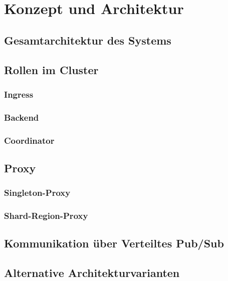 \chapter{Konzept und Architektur}

\section{Gesamtarchitektur des Systems}

\section{Rollen im Cluster}
\subsection{Ingress}
\subsection{Backend}
\subsection{Coordinator}

\section{Proxy}

\subsection{Singleton-Proxy}
\subsection{Shard-Region-Proxy}

\section{Kommunikation über Verteiltes Pub/Sub}


\section{Alternative Architekturvarianten}
